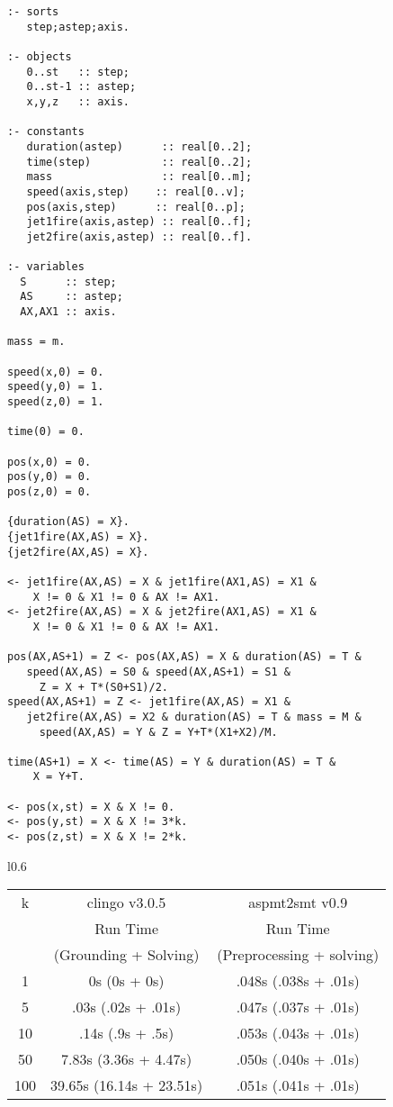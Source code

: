 \documentclass[runningheads]{llncs}
\begin{document}
\BOCC
\begin{lstlisting}
:- sorts
   step;astep;axis.

:- objects
   0..st   :: step;
   0..st-1 :: astep;
   x,y,z   :: axis.

:- constants
   duration(astep)      :: real[0..2];
   time(step)           :: real[0..2];
   mass                 :: real[0..m];
   speed(axis,step)    :: real[0..v];
   pos(axis,step)      :: real[0..p];
   jet1fire(axis,astep) :: real[0..f];
   jet2fire(axis,astep) :: real[0..f].

:- variables
  S      :: step;
  AS     :: astep;
  AX,AX1 :: axis.

mass = m.

speed(x,0) = 0.
speed(y,0) = 1.
speed(z,0) = 1.

time(0) = 0.

pos(x,0) = 0.
pos(y,0) = 0.
pos(z,0) = 0.

{duration(AS) = X}.
{jet1fire(AX,AS) = X}.
{jet2fire(AX,AS) = X}.

<- jet1fire(AX,AS) = X & jet1fire(AX1,AS) = X1 & 
    X != 0 & X1 != 0 & AX != AX1.
<- jet2fire(AX,AS) = X & jet2fire(AX1,AS) = X1 & 
    X != 0 & X1 != 0 & AX != AX1.

pos(AX,AS+1) = Z <- pos(AX,AS) = X & duration(AS) = T & 
   speed(AX,AS) = S0 & speed(AX,AS+1) = S1 & 
	 Z = X + T*(S0+S1)/2.
speed(AX,AS+1) = Z <- jet1fire(AX,AS) = X1 & 
   jet2fire(AX,AS) = X2 & duration(AS) = T & mass = M & 
	 speed(AX,AS) = Y & Z = Y+T*(X1+X2)/M.

time(AS+1) = X <- time(AS) = Y & duration(AS) = T & 
    X = Y+T.

<- pos(x,st) = X & X != 0.
<- pos(y,st) = X & X != 3*k.
<- pos(z,st) = X & X != 2*k.

\end{lstlisting}
\EOCC

\begin{wrapfigure}{l}{0.6\textwidth}
{\footnotesize
\begin{tabular}{|c|c|c|}
\hline 
k & {\sc clingo} v3.0.5 & {\sc aspmt2smt} v0.9  \\ 
 &  Run Time   & Run Time  \\ 
 & (Grounding + Solving) & (Preprocessing + solving) \\ \hline\hline
1 & 0s (0s + 0s)& .048s (.038s + .01s) \\\hline
5 & .03s (.02s + .01s) & .047s (.037s + .01s) \\\hline
10 & .14s (.9s + .5s) & .053s (.043s + .01s) \\\hline
50 & 7.83s (3.36s + 4.47s) & .050s (.040s + .01s) \\\hline
100 & 39.65s (16.14s + 23.51s) & .051s (.041s + .01s) \\\hline
\end{tabular}
}
\end{wrapfigure}
\end{document}
